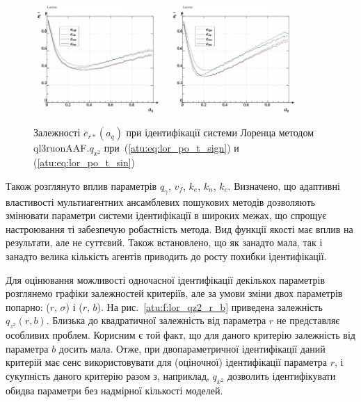 \documentclass[a4paper,13pt]{atuaref}
\begin{document}
\begin{figure}[ht!]
  \centerline{
    \includegraphics[width=0.45\textwidth]{p5/p/cha/lor/ql3ruonAAF/lor_ql3ruonAAF_qx2-p_a_q_e_sign_xl.png}
    \hfill
    \includegraphics[width=0.45\textwidth]{p5/p/cha/lor/ql3ruonAAF/lor_ql3ruonAAF_qx2-p_a_q_e_sin_xl.png}
  }
  \caption{Залежності $\overline{e}_{r*}(a_q)$ при ідентифікації системи Лоренца методом ql3ruonAAF.$q_{x^2}$
   при~(\ref{atu:eq:lor_po_t_sign}) и (\ref{atu:eq:lor_po_t_sin})}
  \label{atu:f:lor_a_q_ql3ruonAAF.q_x2}
\end{figure}

Також розглянуто вплив параметрів $q_\gamma$, $v_f$, $k_e$, $k_n$, $k_c$.
Визначено, що адаптивні властивості мультиагентних ансамблевих пошукових методів дозволяють
змінювати параметри системи ідентифікації в широких межах,
що спрощує настроювання ті забезпечую робастність метода.
Вид функції якості має вплив на результати, але не суттєвий.
Також встановлено, що як занадто мала, так і занадто велика кількість агентів
приводить до росту похибки ідентифікації.

Для оцінювання можливості одночасної ідентифікації декількох параметрів
розглянемо графіки залежностей критеріїв, але за умови зміни двох параметрів
попарно: ($ r $, $\sigma $) і ($ r $, $ b $).
На рис.~\ref{atu:f:lor_qz2_r_b}
приведена залежність
$q_{z^2}(r,b)$.
Близька до квадратичної залежність від параметра $ r $ не представляє особливих
проблем. Корисним є той факт, що для даного критерію залежність від параметра $b $
досить мала. Отже, при двопараметричної ідентифікації даний критерій має
сенс використовувати для (оціночної) ідентифікації параметра $ r $, і
сукупність даного критерію разом з, наприклад, $ q_{x^2} $ дозволить
ідентифікувати обидва параметри без надмірної кількості моделей.
\end{document}
